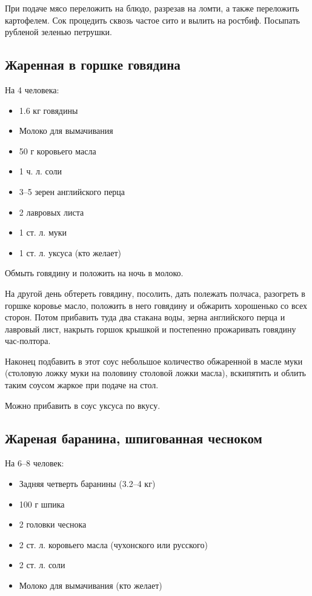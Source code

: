 При подаче мясо переложить на блюдо, разрезав на ломти, а также переложить картофелем. Сок процедить сквозь частое сито и вылить на ростбиф. Посыпать рубленой зеленью петрушки.

\subsection{Жаренная в горшке говядина}\label{6zhar-goviad-gorsh}

 На 4 человека:

\begin{itemize}
	\item 1.6 кг говядины 
    \item Молоко для вымачивания 
    \item 50 г коровьего масла 
    \item 1 ч. л. соли 
    \item 3–5 зерен английского перца 
    \item 2 лавровых листа 
    \item 1 ст. л. муки 
    \item 1 ст. л. уксуса (кто желает)
\end{itemize}

Обмыть говядину и положить на ночь в молоко.

На другой день обтереть говядину, посолить, дать полежать полчаса, разогреть в горшке коровье масло, положить в него говядину и обжарить хорошенько со всех сторон. Потом прибавить туда два стакана воды, зерна английского перца и лавровый лист, накрыть горшок крышкой и постепенно прожаривать говядину час-полтора.

Наконец подбавить в этот соус небольшое количество обжаренной в масле муки (столовую ложку муки на половину столовой ложки масла), вскипятить и облить таким соусом жаркое при подаче на стол.

Можно прибавить в соус уксуса по вкусу.

\subsection{Жареная баранина, шпигованная чесноком}

На 6–8 человек: 

\begin{itemize} 
	\item Задняя четверть баранины (3.2–4 кг) 
    \item 100 г шпика 
    \item 2 головки чеснока 
    \item 2 ст. л. коровьего масла (чухонского или русского) 
    \item 2 ст. л. соли 
    \item Молоко для вымачивания (кто желает)
\end{itemize}

